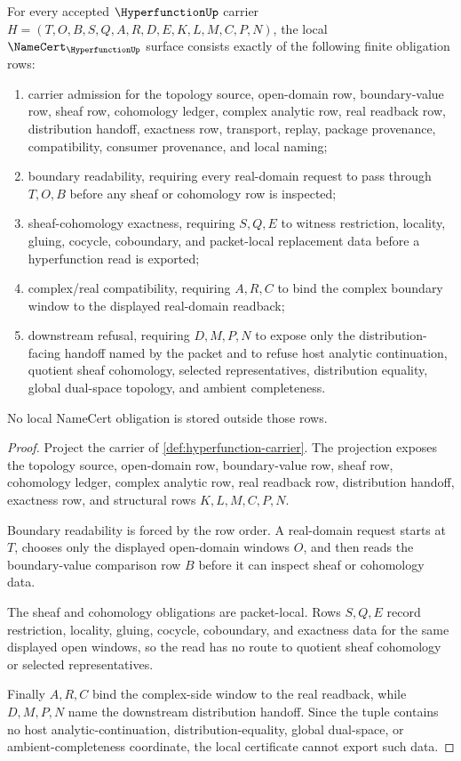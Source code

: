 
\begin{theorem}
\label{thm:hyperfunction-namecert-obligations}
For every accepted $\HyperfunctionUp$ carrier $H=(T,O,B,S,Q,A,R,D,E,K,L,M,C,P,N)$, the local $\NameCert_{\HyperfunctionUp}$ surface consists exactly of the following finite obligation rows:
\begin{enumerate}
\item carrier admission for the topology source, open-domain row, boundary-value row, sheaf row, cohomology ledger, complex analytic row, real readback row, distribution handoff, exactness row, transport, replay, package provenance, compatibility, consumer provenance, and local naming;
\item boundary readability, requiring every real-domain request to pass through $T,O,B$ before any sheaf or cohomology row is inspected;
\item sheaf-cohomology exactness, requiring $S,Q,E$ to witness restriction, locality, gluing, cocycle, coboundary, and packet-local replacement data before a hyperfunction read is exported;
\item complex/real compatibility, requiring $A,R,C$ to bind the complex boundary window to the displayed real-domain readback;
\item downstream refusal, requiring $D,M,P,N$ to expose only the distribution-facing handoff named by the packet and to refuse host analytic continuation, quotient sheaf cohomology, selected representatives, distribution equality, global dual-space topology, and ambient completeness.
\end{enumerate}
No local NameCert obligation is stored outside those rows.
\end{theorem}
\begin{proof}
Project the carrier of \autoref{def:hyperfunction-carrier}. The projection exposes the topology source, open-domain row, boundary-value row, sheaf row, cohomology ledger, complex analytic row, real readback row, distribution handoff, exactness row, and structural rows $K,L,M,C,P,N$.

Boundary readability is forced by the row order. A real-domain request starts at $T$, chooses only the displayed open-domain windows $O$, and then reads the boundary-value comparison row $B$ before it can inspect sheaf or cohomology data.

The sheaf and cohomology obligations are packet-local. Rows $S,Q,E$ record restriction, locality, gluing, cocycle, coboundary, and exactness data for the same displayed open windows, so the read has no route to quotient sheaf cohomology or selected representatives.

Finally $A,R,C$ bind the complex-side window to the real readback, while $D,M,P,N$ name the downstream distribution handoff. Since the tuple contains no host analytic-continuation, distribution-equality, global dual-space, or ambient-completeness coordinate, the local certificate cannot export such data.
\end{proof}
